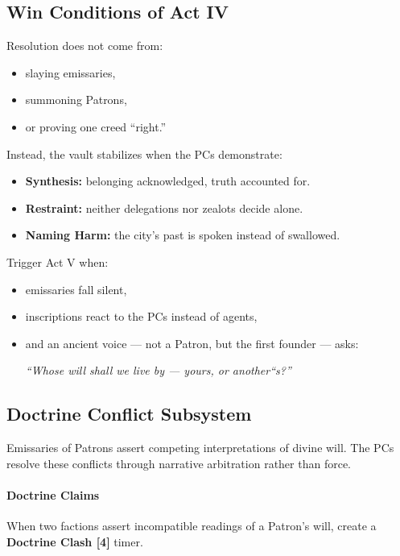 \documentclass[11pt]{article}
\begin{document}
\subsection*{Win Conditions of Act IV}

Resolution does not come from:
\begin{itemize}[leftmargin=*]
  \item slaying emissaries,
  \item summoning Patrons,
  \item or proving one creed ``right.''
\end{itemize}

Instead, the vault stabilizes when the PCs demonstrate:

\begin{itemize}[leftmargin=*]
  \item \textbf{Synthesis:} belonging acknowledged, truth accounted for.
  \item \textbf{Restraint:} neither delegations nor zealots decide alone.
  \item \textbf{Naming Harm:} the city's past is spoken instead of swallowed.
\end{itemize}

Trigger Act V when:
\begin{itemize}[leftmargin=*]
  \item emissaries fall silent,
  \item inscriptions react to the PCs instead of agents,
  \item and an ancient voice --- not a Patron, but the first founder --- asks:

  \begin{center}
     \emph{``Whose will shall we live by --- yours, or another``s?''}
  \end{center}
\end{itemize}

\subsection*{Doctrine Conflict Subsystem}
\label{subsec:doctrineconflict}

Emissaries of Patrons assert competing interpretations of divine will.
The PCs resolve these conflicts through narrative arbitration rather
than force.

\paragraph{Doctrine Claims}
When two factions assert incompatible readings of a Patron's will,
create a \textbf{Doctrine Clash [4]} timer.
\end{document}
